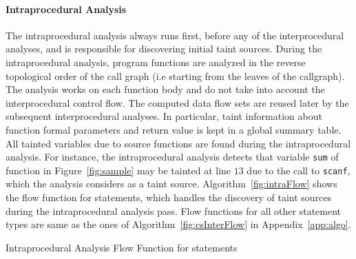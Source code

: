 \paragraph{Intraprocedural Analysis}
The intraprocedural analysis always runs first, before any of
the interprocedural analyses, and is responsible for discovering
initial taint sources. During the intraprocedural analysis,
program functions are analyzed in the reverse topological order
of the call graph (i.e starting from the leaves of the callgraph).
The analysis works on each function body and do not take into account
the interprocedural control flow. The computed data flow sets are
reused later by the subsequent interprocedural analyses. In particular,
taint information about function formal parameters and return
value is kept in a global summary table. All tainted variables due
to source functions are found during the intraprocedural analysis.
For instance, the intraprocedural analysis detects that variable
\texttt{sum} of function \compute{} in Figure~\ref{fig:sample}
may be tainted at line $13$ due to the call to \texttt{scanf}, which
the analysis considers as a taint source. 
Algorithm~\ref{fig:intraFlow} shows the flow function for
\callt statements, which handles the discovery of taint sources
during the intraprocedural analysis pass.
Flow functions for all other statement types are same as the ones
of Algorithm~\ref{fig:csInterFlow} in Appendix~\ref{app:algo}.
\begin{algorithm}
\caption{Intraprocedural Analysis Flow Function for \callt statements}\label{fig:intraFlow}
\LinesNumbered
\DontPrintSemicolon
{}

\OutData{}
\end{algorithm}

